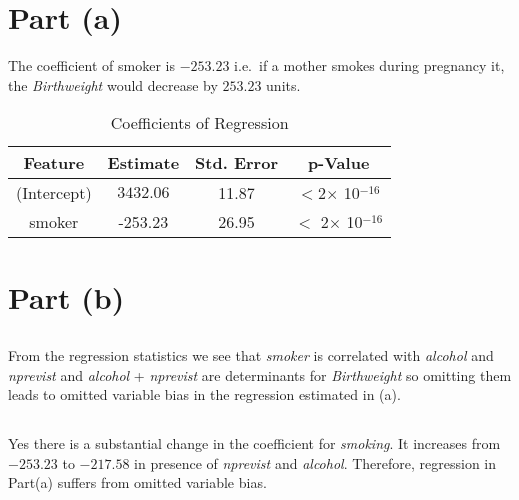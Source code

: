 \documentclass{./solution}
\begin{document}
    \begin{solution}
        \section{Part (a)}
            The coefficient of smoker is $-253.23$ i.e.\ if a mother smokes during
            pregnancy it, the \textit{Birthweight} would decrease by $253.23$ units.

            \begin{table}[H]
                \caption{Coefficients of Regression}
                \begin{tabularx}{\textwidth}{C C C C}
                    \toprule
                    Feature & Estimate & Std. Error & p-Value \\
                    \midrule
                    (Intercept) & $3432.06$ &  11.87 & $<$2$\times$ 10$^{-16}$ \\
                    smoker         &  -253.23 & 26.95 &  $<$ 2$\times$ 10$^{-16}$ \\

                    \bottomrule
                \end{tabularx}
            \end{table}
            \vspace{-5mm}

        \section{Part (b)}
            \subsection{}
            From the regression statistics we see that \textit{smoker} is correlated with \textit{alcohol} and \textit{nprevist} and \textit{alcohol} + \textit{nprevist} are determinants for \textit{Birthweight} so omitting
            them leads to  omitted variable bias in the regression estimated in (a).

            \subsection{}
            Yes there is a substantial change in the coefficient for \textit{smoking}.
            It increases from $-253.23$ to $-217.58$ in presence of \textit{nprevist} and \textit{alcohol}. Therefore, regression in Part(a)
            suffers from omitted variable bias.


\end{solution}
\end{document}
